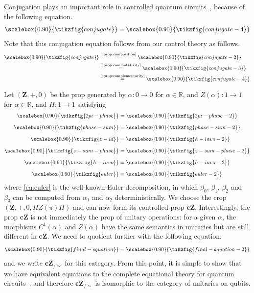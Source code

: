 \documentclass[a4paper]{article}
\theoremstyle{plain}
\theoremstyle{definition}
\newcommand{\tf}[1]{\scalebox{0.90}{\tikzfig{#1}}}
\newcommand{\cat}[1]{\mathbf{#1}}
\newcommand{\ccat}[1]{\mathbf{c #1}}
\newcommand{\R}{{\mathbb R}}
\newcommand{\quo}{_{/\simeq}}
\begin{document}
Conjugation plays an important role in controlled quantum
circuits~\cite{delorme2025control}, because of the following equation.
\begin{equation}\label{eq:conj}
	\tf{conjugate} = \tf{conjugate-4}
\end{equation}
Note that this conjugation equation follows from our control theory as follows.
\begin{align*}
	\tf{conjugate}
	&\stackrel{\text{\ref{cprop:composition}}}{=}
	\tf{conjugate-2} \\
	&\stackrel{\text{\ref{cprop:commutativity}}}{=}
	\tf{conjugate-3} \\
	&\stackrel{\text{\ref{cprop:complementarity}}}{=}
	\tf{conjugate-4}
\end{align*}

Let $(\cat Z, +, 0)$ be the prop generated by $\alpha \colon 0 \to 0$ for $\alpha \in
\R$, and $Z(\alpha) \colon 1 \to 1$ for $\alpha \in \R$, and $H \colon 1 \to 1$
satisfying
\begin{align}
	\label{eq:2pi-phase}
	\tf{2pi-phase} &= \tf{2pi-phase-2}
	\\[1.5ex]
	\label{eq:phase-sum}
	\tf{phase-sum} &= \tf{phase-sum-2}
	\\[1.5ex]
	\label{eq:z-id}
	\tf{z-id} &= \tf{h-invo-2}
	\\[1.5ex]
	\label{eq:z-sum}
	\tf{z-sum-phase} &= \tf{z-sum-phase-2}
	\\[1.5ex]
	\label{eq:h-invo}
	\tf{h-invo} &= \tf{h-invo-2}
	\\[1.5ex]
	\label{eq:euler}
	\tf{euler} &= \tf{euler-2}
\end{align}
where \eqref{eq:euler} is the well-known Euler decomposition, in which
$\beta_0$, $\beta_1$, $\beta_2$ and $\beta_3$ can be computed from $\alpha_1$
and $\alpha_2$ deterministically. We choose the crop $(\cat Z, +, 0, HZ(\pi)H)$
and can now form its controlled prop $\ccat Z$. Interestingly, the prop $\ccat
Z$ is not immediately the prop of unitary operations: for a given $\alpha$, the
morphisms $C^1(\alpha)$ and $Z(\alpha)$ have the same semantics in unitaries
but are still different in $\ccat Z$. We need to quotient further with the
following equation:
\begin{equation}\label{eq:final-quantum}
	\tf{final-equation} = \tf{final-equation-2}
\end{equation}
and we write $\ccat Z\quo$ for this category. From this point, it is simple to
show that we have equivalent equations to the complete equational theory for
quantum circuits~\cite{delorme2025control}, and therefore $\ccat Z\quo$ is
isomorphic to the category of unitaries on qubits.
\end{document}
